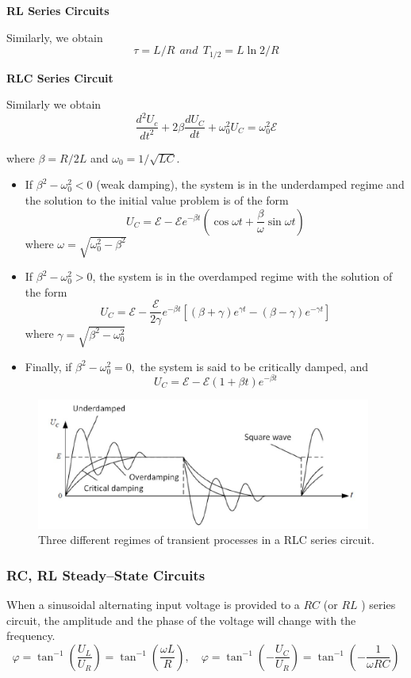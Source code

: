 \documentclass[12pt,a4paper]{article}
\begin{document}
\textbf{RL Series Circuits}\par
Similarly, we obtain 
$$\tau=L/R ~~and~~ T_{1/2}=L\ln{2}/R$$


\textbf{RLC Series Circuit}\par 

Similarly we obtain
$$\frac{d^2U_c}{dt^2}+2\beta\frac{dU_C}{dt}+\omega_0^2U_C=\omega_0^2\mathcal{E}$$\par
where $\beta=R/2L$ and $\omega_0=1/\sqrt{LC}$.\par

\begin{itemize}
    \item  If $\beta^{2}-\omega_{0}^{2}<0$ (weak damping), the system is in the underdamped regime and the solution to the initial value problem is of the form
    $$
    U_{C}=\mathcal{E}-\mathcal{E} e^{-\beta t}\left(\cos \omega t+\frac{\beta}{\omega} \sin \omega t\right)
    $$
    where $\omega=\sqrt{\omega_{0}^{2}-\beta^{2}}$
    \item  If $\beta^{2}-\omega_{0}^{2}>0$, the system is in the overdamped regime with the solution of the form
    $$
    U_{C}=\mathcal{E}-\frac{\mathcal{E}}{2 \gamma} e^{-\beta t}\left[(\beta+\gamma) e^{\gamma t}-(\beta-\gamma) e^{-\gamma t}\right]
    $$
    where $\gamma=\sqrt{\beta^{2}-\omega_{0}^{2}}$
    \item Finally, if $\beta^{2}-\omega_{0}^{2}=0,$ the system is said to be critically damped, and
    $$
    U_{C}=\mathcal{E}-\mathcal{E}(1+\beta t) e^{-\beta t}
    $$
\end{itemize}

\begin{figure}[h]
	\centering
	\includegraphics[width=11cm]{2}
	\caption{Three different regimes of transient processes in a RLC series circuit.}
	\label{fig:front}
\end{figure}

\subsubsection{RC, RL Steady–State Circuits}
\quad When a sinusoidal alternating input voltage is provided to a $R C$ (or $R L$ ) series circuit, the amplitude and the phase of the voltage will change with the frequency. 
$$
\varphi=\tan ^{-1}\left(\frac{U_{L}}{U_{R}}\right)=\tan ^{-1}\left(\frac{\omega L}{R}\right), \quad \varphi=\tan ^{-1}\left(-\frac{U_{C}}{U_{R}}\right)=\tan ^{-1}\left(-\frac{1}{\omega R C}\right)
$$
\end{document}
